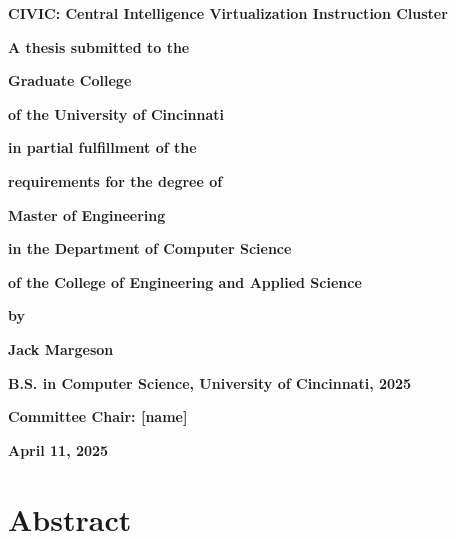 \documentclass[12pt]{article}
\begin{document}
\thispagestyle{empty}
\begin{titlepage}
    \centering

    \vspace*{-1.8cm}
    {\Huge \textbf{CIVIC: Central Intelligence Virtualization Instruction Cluster} \par}
    \vspace{1.3cm}

    {\large \textbf{A thesis submitted to the} \par}
    {\large \textbf{Graduate College} \par}
    {\large \textbf{of the University of Cincinnati} \par}
    {\large \textbf{in partial fulfillment of the} \par}
    {\large \textbf{requirements for the degree of} \par}
    \vspace{1cm}

    {\large \textbf{Master of Engineering} \par}
    \vspace{1cm}

    {\large \textbf{in the Department of Computer Science} \par}
    {\large \textbf{of the College of Engineering and Applied Science} \par}
    \vspace{1.3cm}

    {\large \textbf{by} \par}
    {\large \textbf{Jack Margeson} \par}
    {\textbf{B.S. in Computer Science, University of Cincinnati, 2025} \par}
    \vspace{1.5cm}

    {\large \textbf{Committee Chair: [name]} \par}

    \vspace{1cm}
    {\large \textbf{April 11, 2025} \par}

    \vspace*{0.5cm}
    \vspace{1cm}
\end{titlepage}

\setcounter{page}{2}

\section*{Abstract}
\end{document}
